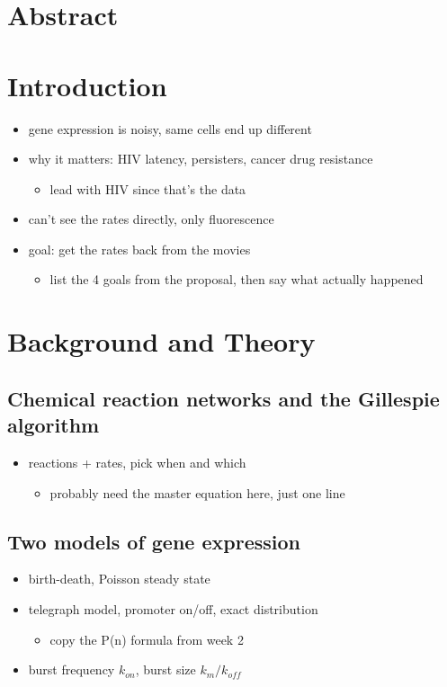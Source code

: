 \chapter*{Abstract}

\chapter{Introduction}
\begin{itemize}
  \item gene expression is noisy, same cells end up different \cite{elowitz2002}
  \item why it matters: HIV latency, persisters, cancer drug resistance
  \begin{itemize}
    \item lead with HIV since that's the data
  \end{itemize}
  \item can't see the rates directly, only fluorescence
  \item goal: get the rates back from the movies
  \begin{itemize}
    \item list the 4 goals from the proposal, then say what actually happened
  \end{itemize}
\end{itemize}

\chapter{Background and Theory}

\section{Chemical reaction networks and the Gillespie algorithm}
\begin{itemize}
  \item reactions + rates, pick when and which \cite{wilkinson2019}
  \begin{itemize}
    \item probably need the master equation here, just one line
  \end{itemize}
\end{itemize}

\section{Two models of gene expression}
\begin{itemize}
  \item birth-death, Poisson steady state
  \item telegraph model, promoter on/off, exact distribution \cite{peccoud1995}
  \begin{itemize}
    \item copy the P(n) formula from week 2
  \end{itemize}
  \item burst frequency $k_{on}$, burst size $k_m/k_{off}$
\end{itemize}

